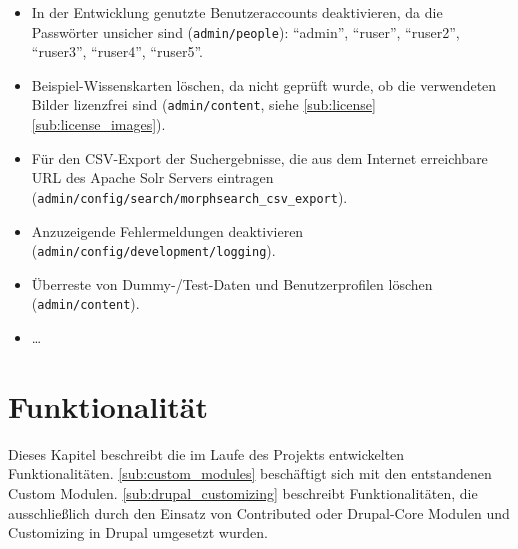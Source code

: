 \begin{itemize}
	\item In der Entwicklung genutzte Benutzeraccounts deaktivieren, da die Passwörter unsicher sind (\lstinline|admin/people|): \enquote{admin}, \enquote{ruser}, \enquote{ruser2}, \enquote{ruser3}, \enquote{ruser4}, \enquote{ruser5}.

	\item Beispiel-Wissenskarten löschen, da nicht geprüft wurde, ob die verwendeten Bilder lizenzfrei sind (\lstinline|admin/content|, siehe \cref*{sub:license} \cref{sub:license_images}).

	\item Für den CSV-Export der Suchergebnisse, die aus dem Internet erreichbare URL des Apache Solr Servers eintragen (\lstinline|admin/config/search/morphsearch_csv_export|).

	\item Anzuzeigende Fehlermeldungen deaktivieren (\lstinline|admin/config/development/logging|).
	
	\item Überreste von Dummy-/Test-Daten und Benutzerprofilen löschen (\lstinline|admin/content|).
	
	\item \dots {}

\end{itemize}



\newpage
\section{Funktionalität}\label{sec:function}
Dieses Kapitel beschreibt die im Laufe des Projekts entwickelten Funktionalitäten. \cref{sub:custom_modules} beschäftigt sich mit den entstandenen Custom Modulen. \cref{sub:drupal_customizing} beschreibt Funktionalitäten, die ausschließlich durch den Einsatz von Contributed oder Drupal-Core Modulen und Customizing in Drupal umgesetzt wurden.

